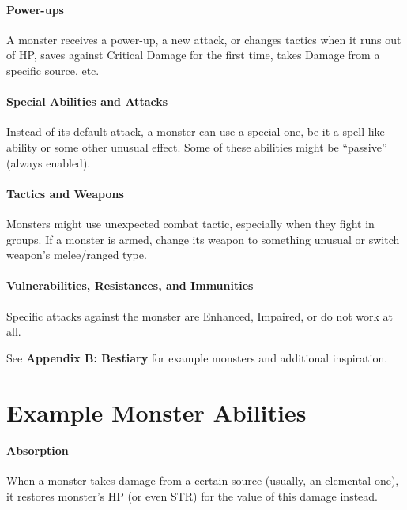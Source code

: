 \documentclass[itdr]{subfiles}
\begin{document}
\paragraph{Power-ups}
A monster receives a power-up, a new attack, or changes tactics when it runs out of HP, saves against Critical Damage for the first time, takes Damage from a specific source, etc.

\paragraph{Special Abilities and Attacks}
Instead of its default attack, a monster can use a special one, be it a spell-like ability or some other unusual effect. Some of these abilities might be ``passive'' (always enabled).

\paragraph{Tactics and Weapons}
Monsters might use unexpected combat tactic, especially when they fight in groups. If a monster is armed, change its weapon to something unusual or switch weapon's melee/ranged type.

\paragraph{Vulnerabilities, Resistances, and Immunities}
Specific attacks against the monster are Enhanced, Impaired, or do not work at all.

\vfill

\begin{dbox}
	See \textbf{Appendix B: Bestiary} for example monsters and additional inspiration.
\end{dbox}

\vfill

\break

\section{Example Monster Abilities}

\paragraph{Absorption}
When a monster takes damage from a certain source (usually, an elemental one), it restores monster's HP (or even STR) for the value of this damage instead.
\end{document}
